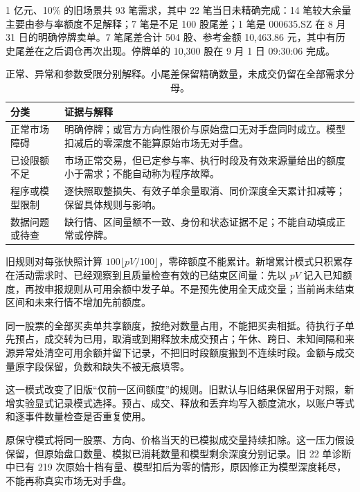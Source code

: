 1 亿元、10\% 的旧场景共 93 笔需求，其中 22 笔当日未精确完成：14 笔较大余量主要由参与率额度不足解释；7 笔是不足 100 股尾差；1 笔是 000635.SZ 在 8 月 31 日的明确停牌卖单。7 笔尾差合计 504 股、参考金额 10,463.86 元，其中有历史尾差在之后调仓再次出现。停牌单的 10,300 股在 9 月 1 日 09:30:06 完成。

\begin{table}[H]\centering\small
\begin{tabularx}{\linewidth}{p{28mm}Y}
\toprule 分类 & 证据与解释\\\midrule
正常市场障碍 & 明确停牌；或官方方向性限价与原始盘口无对手盘同时成立。模型扣减后的零深度不能算原始市场无对手盘。\\
已设限额不足 & 市场正常交易，但已定参与率、执行时段及有效来源量给出的额度小于需求；不能自动称为程序故障。\\
程序或模型限制 & 逐快照取整损失、有效子单余量取消、同价深度全天累计扣减等；保留具体规则与影响。\\
数据问题或待查 & 缺行情、区间量额不一致、身份和状态证据不足；不能自动填成正常或停牌。\\
\bottomrule
\end{tabularx}
\caption{正常、异常和参数受限分别解释。小尾差保留精确数量，未成交仍留在全部需求分母。}
\end{table}

\clearpage
{}
旧规则对每张快照计算 $100\lfloor pV/100\rfloor$，零碎额度不能累计。新增累计模式只积累存在活动需求时、已经观察到且质量检查有效的已结束区间量：先以 $pV$ 记入已知额度，再按申报规则从可用余额中发子单。不是预先使用全天成交量；当前尚未结束区间和未来行情不增加先前额度。

同一股票的全部买卖单共享额度，按绝对数量占用，不能把买卖相抵。待执行子单先预占，成交转为已用，取消或到期释放未成交预占；午休、跨日、未知间隔和来源异常处清空可用余额并留下记录，不把旧时段额度搬到不连续时段。金额与成交量原字段保留，负数和缺失不被无痕填零。

这一模式改变了旧版“仅前一区间额度”的规则。旧默认与旧结果保留用于对照，新增实验显式记录模式选择。预占、成交、释放和丢弃均写入额度流水，以账户等式和逐事件数量检查是否重复使用。

原保守模式将同一股票、方向、价格当天的已模拟成交量持续扣除。这一压力假设保留，但原始盘口数量、模拟已消耗数量和模型剩余深度分别记录。旧 22 单诊断中已有 219 次原始十档有量、模型扣后为零的情形，原因修正为模型深度耗尽，不能再称真实市场无对手盘。


